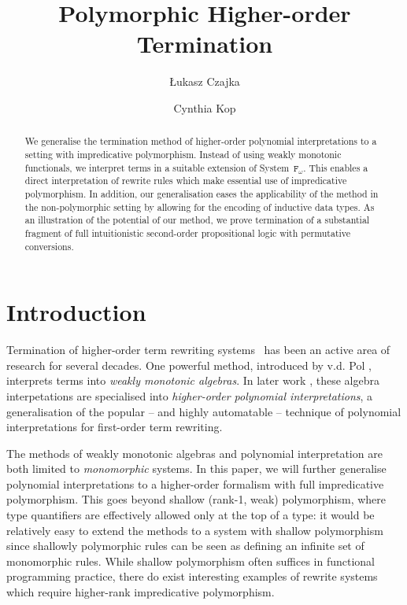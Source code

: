 \documentclass[a4paper,UKenglish,cleveref,autoref,numberwithinsect]{lipics-v2019}
\title{Polymorphic Higher-order Termination}
\author{{\L}ukasz Czajka}{Faculty of Informatics, TU Dortmund, Germany \and \url{http://www.mimuw.edu.pl/~lukaszcz/} }{lukaszcz@mimuw.edu.pl}{https://orcid.org/0000-0001-8083-4280}{}
\author{Cynthia Kop}{Institute of Computer Science, Radboud University Nijmegen, Netherlands \and \url{https://www.cs.ru.nl/~cynthiakop/}}{c.kop@cs.ru.nl}{https://orcid.org/0000-0002-6337-2544}{}
\theoremstyle{definition}
\newcommand{\Fomega}{\mathtt{F}_\omega}
\begin{document}
\maketitle

\begin{abstract}
  We generalise the termination method of higher-order polynomial
  interpretations to a setting with impredicative
  polymorphism. Instead of using weakly monotonic functionals, we
  interpret terms in a suitable extension of System~$\Fomega$. This
  enables a direct interpretation of rewrite rules which make
  essential use of impredicative polymorphism.  In addition, our
  generalisation eases the applicability of the method in the
  non-polymorphic setting by allowing for the encoding of inductive data
  types. As an illustration of the potential of our method, we prove
  termination of a substantial fragment of full intuitionistic
  second-order propositional logic with permutative conversions.
\end{abstract}

\section{Introduction}

Termination of higher-order term rewriting
systems~\cite[Chapter~11]{Terese2003} has been an active area of
research for several decades.
One powerful method, introduced by v.d. Pol \cite{Pol1993,pol:96},
interprets terms into \emph{weakly monotonic algebras}.  In later work
\cite{FuhsKop2012,Kop2012}, these algebra interpetations are specialised
into \emph{higher-order polynomial interpretations}, a generalisation of
the popular -- and highly automatable -- technique of polynomial
interpretations for first-order term rewriting.

The methods of weakly monotonic algebras and polynomial
interpretation are both limited to \emph{monomorphic} systems.
In this paper, we will further generalise polynomial
interpretations to a higher-order formalism with full impredicative
polymorphism.
%
%
This goes beyond shallow (rank-1, weak) polymorphism,
where type quantifiers are effectively allowed only at the top of a
type: it would be relatively easy to extend the methods to a system
with shallow polymorphism since shallowly polymorphic rules can be seen as defining an
infinite set of monomorphic rules.
While shallow polymorphism often suffices
in functional programming practice, there do exist interesting
examples of rewrite systems which require higher-rank impredicative
polymorphism.
\end{document}
